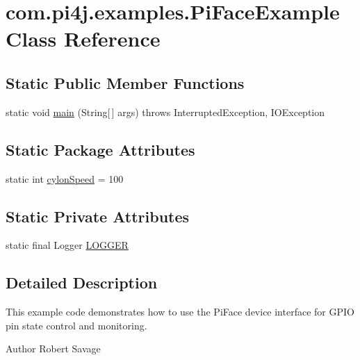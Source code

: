 \hypertarget{classcom_1_1pi4j_1_1examples_1_1PiFaceExample}{}\section{com.\+pi4j.\+examples.\+Pi\+Face\+Example Class Reference}
\label{classcom_1_1pi4j_1_1examples_1_1PiFaceExample}
\subsection*{Static Public Member Functions}
\begin{DoxyCompactItemize}
\item 
static void \hyperlink{classcom_1_1pi4j_1_1examples_1_1PiFaceExample_a86154f418f6b514cabe6e624b417a737}{main} (String\mbox{[}$\,$\mbox{]} args)  throws Interrupted\+Exception,             I\+O\+Exception 
\end{DoxyCompactItemize}
\subsection*{Static Package Attributes}
\begin{DoxyCompactItemize}
\item 
static int \hyperlink{classcom_1_1pi4j_1_1examples_1_1PiFaceExample_ab3aacd20993a4f82b9bf2d2cdf4fd35c}{cylon\+Speed} = 100
\end{DoxyCompactItemize}
\subsection*{Static Private Attributes}
\begin{DoxyCompactItemize}
\item 
static final Logger \hyperlink{classcom_1_1pi4j_1_1examples_1_1PiFaceExample_a2cb21260299dce63698aebd5f3c7d69f}{L\+O\+G\+G\+E\+R}
\end{DoxyCompactItemize}


\subsection{Detailed Description}
This example code demonstrates how to use the Pi\+Face device interface for G\+P\+I\+O pin state control and monitoring. 

\begin{DoxyAuthor}{Author}
Robert Savage 
\end{DoxyAuthor}


